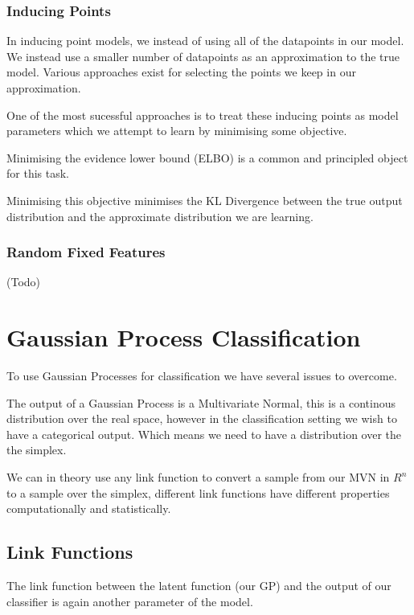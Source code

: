 \documentclass[12pt, a4paper]{report}
\theoremstyle{definition}
\begin{document}
\subsubsection{Inducing Points}

In inducing point models, we instead of using all of the datapoints in our model. We instead use a smaller number of datapoints as an approximation to the true model. Various approaches exist for selecting the points we keep in our approximation.

One of the most sucessful approaches is to treat these inducing points as model parameters which we attempt to learn by minimising some objective.

Minimising the evidence lower bound (ELBO) is a common and principled object for this task.

Minimising this objective minimises the KL Divergence between the true output distribution and the approximate distribution we are learning.

\subsubsection{Random Fixed Features}

(Todo)





\section{Gaussian Process Classification}


To use Gaussian Processes for classification we have several issues to overcome.

The output of a Gaussian Process is a Multivariate Normal, this is a continous distribution over the real space, however in the classification setting we wish to have a categorical output. Which means we need to have a distribution over the the simplex.

We can in theory use any link function to convert a sample from our MVN in $R^n$ to a sample over the simplex, different link functions have different properties computationally and statistically.

\subsection{Link Functions}

The link function between the latent function (our GP) and the output of our classifier is again another parameter of the model.
\end{document}
